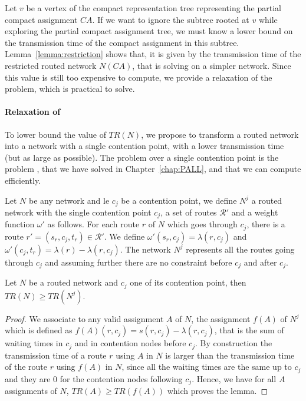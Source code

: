 Let $v$ be a vertex of the compact representation tree representing the partial compact assignment $CA$.
If we want to ignore the subtree rooted at $v$ while exploring the partial compact assignment tree,
we must know a lower bound on the transmission time of the compact assignment in this subtree.
Lemma~\ref{lemma:restriction} shows that, it is given by the transmission time of the restricted routed network
$N(CA)$, that is solving \spall on a simpler network. Since this value is still too expensive to compute, we provide a relaxation of the problem, which is practical to solve.

\paragraph{Relaxation of \spall}

To lower bound the value of $TR(N)$, we propose to transform a routed network into a network with a single contention point, with a lower transmission time (but as large as possible). The problem \spall over a single contention point is the problem \wta, that we have solved in Chapter~\ref{chap:PALL}, and that we can compute efficiently.

Let $N$ be any network and le $c_j$ be a contention point, we define $N^j$ a routed network with the
single contention point $c_j$, a set of routes $\mathcal{R}'$ and a weight function $\omega'$ as follows. For each route $r$ of $N$ which goes through $c_j$, there is a route $r' = (s_r,c_j,t_r) \in \mathcal{R}'$. We define $\omega'(s_r,c_j) = \lambda(r,c_j)$ and $\omega'(c_j,t_r) =  \lambda(r) - \lambda(r,c_j)$. The network $N^j$ represents all the routes going through $c_j$ and assuming further there are no constraint before $c_j$ and after $c_j$.   

\begin{lemma}\label{lemma:lowerbound}
Let $N$ be a routed network and $c_j$ one of its contention point, then $TR(N) \geq TR(N^j)$.
\end{lemma}
\begin{proof}
We associate to any valid assignment $A$ of $N$, the assignment $f(A)$ of $N^j$
which is defined as $f(A)(r,c_j) = s(r,c_j) - \lambda(r,c_j)$, that is the sum of waiting times in $c_j$ and in contention nodes before $c_j$. By construction the transmission time of a route $r$ using $A$ in $N$ is larger than 
the transmission time of the route $r$ using $f(A)$ in $N$, since all the waiting times are the same up to 
$c_j$ and they are $0$ for the contention nodes following $c_j$. Hence, we have for all $A$ assignments of $N$,
$TR(A) \geq TR(f(A))$ which proves the lemma. 
\end{proof}


